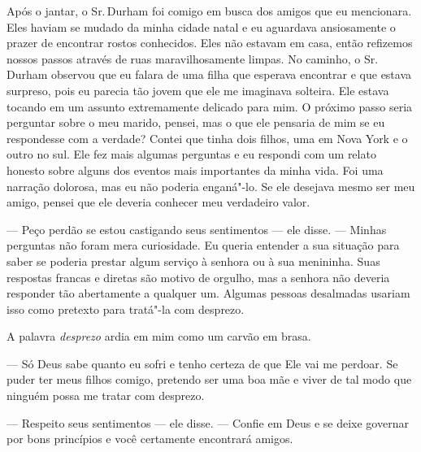 Após o jantar, o Sr.\,Durham foi comigo
em busca dos amigos que eu mencionara. Eles haviam se mudado da minha
cidade natal e eu aguardava ansiosamente o prazer de encontrar rostos
conhecidos. Eles não estavam em casa, então refizemos nossos passos
através de ruas maravilhosamente limpas. No caminho, o Sr.\,Durham
observou que eu falara de uma filha que esperava encontrar e que estava
surpreso, pois eu parecia tão jovem que ele me imaginava solteira. Ele
estava tocando em um assunto extremamente delicado para mim. O próximo
passo seria perguntar sobre o meu marido, pensei, mas o que ele pensaria
de mim se eu respondesse com a verdade? Contei que tinha dois filhos,
uma em Nova York e o outro no sul. Ele fez mais algumas perguntas e eu
respondi com um relato honesto sobre alguns dos eventos mais importantes
da minha vida. Foi uma narração dolorosa, mas eu não poderia enganá"-lo.
Se ele desejava mesmo ser meu amigo, pensei que ele deveria conhecer meu
verdadeiro valor.

--- Peço perdão se estou castigando seus sentimentos --- ele disse. ---
Minhas perguntas não foram mera curiosidade. Eu queria entender a sua
situação para saber se poderia prestar algum serviço à senhora ou à sua
menininha. Suas respostas francas e diretas são motivo de orgulho, mas a
senhora não deveria responder tão abertamente a qualquer um. Algumas
pessoas desalmadas usariam isso como pretexto para tratá"-la com
desprezo.

A palavra \emph{desprezo} ardia em mim
como um carvão em brasa.

--- Só Deus sabe quanto eu sofri e tenho certeza de que Ele vai me
perdoar. Se puder ter meus filhos comigo, pretendo ser uma boa mãe e
viver de tal modo que ninguém possa me tratar com desprezo.

--- Respeito seus sentimentos --- ele
disse. --- Confie em Deus e se deixe governar por bons princípios e você
certamente encontrará amigos.

